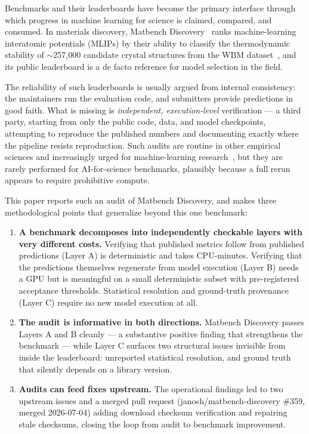 \documentclass[11pt]{article}
\begin{document}
Benchmarks and their leaderboards have become the primary interface through
which progress in machine learning for science is claimed, compared, and
consumed. In materials discovery, Matbench Discovery~\cite{riebesell2025}
ranks machine-learning interatomic potentials (MLIPs) by their ability to
classify the thermodynamic stability of $\sim$257{,}000 candidate crystal
structures from the WBM dataset~\cite{wang2021wbm}, and its public leaderboard
is a de facto reference for model selection in the field.

The reliability of such leaderboards is usually argued from internal
consistency: the maintainers run the evaluation code, and submitters
provide predictions in good faith. What is missing is \emph{independent,
execution-level} verification --- a third party, starting from only the public
code, data, and model checkpoints, attempting to reproduce the published
numbers and documenting exactly where the pipeline resists reproduction. Such
audits are routine in other empirical sciences and increasingly urged for
machine-learning research~\cite{kapoor2023}, but they are rarely performed for
AI-for-science benchmarks, plausibly because a full rerun appears to require
prohibitive compute.

This paper reports such an audit of Matbench Discovery, and makes three
methodological points that generalize beyond this one benchmark:

\begin{enumerate}
\item \textbf{A benchmark decomposes into independently checkable layers with
very different costs.} Verifying that published metrics follow from published
predictions (Layer A) is deterministic and takes CPU-minutes. Verifying that
the predictions themselves regenerate from model execution (Layer B) needs a
GPU but is meaningful on a small deterministic subset with pre-registered
acceptance thresholds. Statistical resolution and ground-truth provenance
(Layer C) require no new model execution at all.
\item \textbf{The audit is informative in both directions.} Matbench
Discovery passes Layers A and B cleanly --- a substantive positive finding that
strengthens the benchmark --- while Layer C surfaces two structural issues
invisible from inside the leaderboard: unreported statistical resolution, and
ground truth that silently depends on a library version.
\item \textbf{Audits can feed fixes upstream.} The operational findings led
to two upstream issues and a merged pull request (janosh/matbench-discovery
\#359, merged 2026-07-04) adding download checksum verification and repairing
stale checksums, closing the loop from audit to benchmark improvement.
\end{enumerate}
\end{document}
